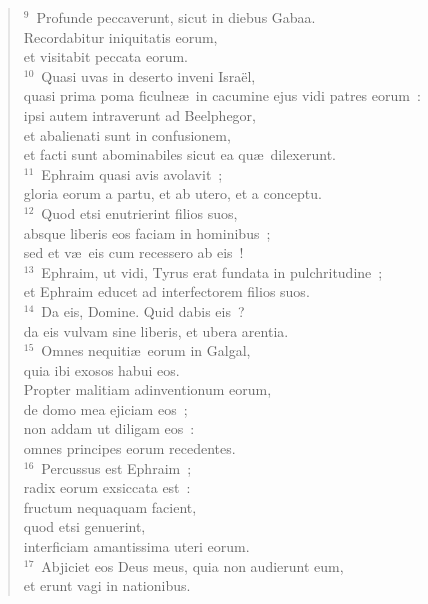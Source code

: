 \begin{flushleft}
\begin{verse}
${}^{9}$~Profunde peccaverunt, sicut in diebus Gabaa.\\ Recordabitur iniquitatis eorum,\\ et visitabit peccata eorum.\\
${}^{10}$~Quasi uvas in deserto inveni Isra\"el,\\ quasi prima poma ficulne\ae\ in cacumine ejus vidi patres eorum~:\\ ipsi autem intraverunt ad Beelphegor,\\ et abalienati sunt in confusionem,\\ et facti sunt abominabiles sicut ea qu\ae\ dilexerunt.\\
${}^{11}$~Ephraim quasi avis avolavit~;\\ gloria eorum a partu, et ab utero, et a conceptu.\\
${}^{12}$~Quod etsi enutrierint filios suos,\\ absque liberis eos faciam in hominibus~;\\ sed et v\ae\ eis cum recessero ab eis~!\\
${}^{13}$~Ephraim, ut vidi, Tyrus erat fundata in pulchritudine~;\\ et Ephraim educet ad interfectorem filios suos.\\
${}^{14}$~Da eis, Domine. Quid dabis eis~?\\ da eis vulvam sine liberis, et ubera arentia.\\
${}^{15}$~Omnes nequiti\ae\ eorum in Galgal,\\ quia ibi exosos habui eos.\\ Propter malitiam adinventionum eorum,\\ de domo mea ejiciam eos~;\\ non addam ut diligam eos~:\\ omnes principes eorum recedentes.\\
${}^{16}$~Percussus est Ephraim~;\\ radix eorum exsiccata est~:\\ fructum nequaquam facient,\\ quod etsi genuerint,\\ interficiam amantissima uteri eorum.\\
${}^{17}$~Abjiciet eos Deus meus, quia non audierunt eum,\\ et erunt vagi in nationibus.\end{verse}\end{flushleft}


